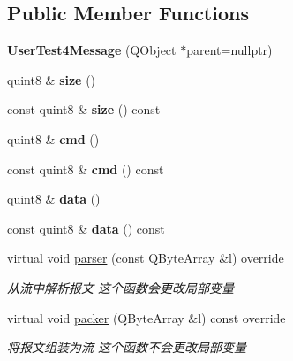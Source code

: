 \subsection*{Public Member Functions}
\begin{DoxyCompactItemize}
\item 
\mbox{\label{class_user_test4_message_af1191a49dd5ca878656b331a774b66fe}} 
{\bfseries User\+Test4\+Message} (Q\+Object $\ast$parent=nullptr)
\item 
\mbox{\label{class_user_test4_message_ab706eeedf20fb55ef81d79b753de8221}} 
quint8 \& {\bfseries size} ()
\item 
\mbox{\label{class_user_test4_message_abacc479c7d8aeca5b4a366c11d622840}} 
const quint8 \& {\bfseries size} () const
\item 
\mbox{\label{class_user_test4_message_abf6a2c2548afb9f977a847f9d4645edb}} 
quint8 \& {\bfseries cmd} ()
\item 
\mbox{\label{class_user_test4_message_ad030674646260351619421b77d78174a}} 
const quint8 \& {\bfseries cmd} () const
\item 
\mbox{\label{class_user_test4_message_a23bd61b8f118fb9f4720d4f7f9b5d605}} 
quint8 \& {\bfseries data} ()
\item 
\mbox{\label{class_user_test4_message_a21f46626b16afbff9412c7b83a489191}} 
const quint8 \& {\bfseries data} () const
\item 
virtual void \mbox{\hyperlink{class_user_test4_message_ab3baa9085d706a56fd96b9bcfd2e99fe}{parser}} (const Q\+Byte\+Array \&l) override
\begin{DoxyCompactList}\small\item\em 从流中解析报文 这个函数会更改局部变量 \end{DoxyCompactList}\item 
virtual void \mbox{\hyperlink{class_user_test4_message_a3fc63f87f26e82c43b4cb5f55971cde7}{packer}} (Q\+Byte\+Array \&l) const override
\begin{DoxyCompactList}\small\item\em 将报文组装为流 这个函数不会更改局部变量 \end{DoxyCompactList}\end{DoxyCompactItemize}



